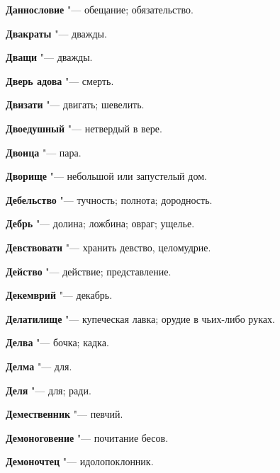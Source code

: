 \begin{mymulticols}{2}
\noindent\textbf{Даннословие} "--- обещание; обязательство. 




\noindent\textbf{Двакраты} "--- дважды. 




\noindent\textbf{Дващи} "--- дважды. 




\noindent\textbf{Дверь адова} "--- смерть. 




\noindent\textbf{Двизати} "--- двигать; шевелить. 




\noindent\textbf{Двоедушный} "--- нетвердый в вере. 




\noindent\textbf{Двоица} "--- пара. 




\noindent\textbf{Дворище} "--- небольшой или запустелый дом. 




\noindent\textbf{Дебельство} "--- тучность; полнота; дородность. 




\noindent\textbf{Дебрь} "--- долина; ложбина; овраг; ущелье. 




\noindent\textbf{Девствовати} "--- хранить девство, целомудрие. 




\noindent\textbf{Действо} "--- действие; представление. 




\noindent\textbf{Декемврий} "--- декабрь. 




\noindent\textbf{Делатилище} "--- купеческая лавка; орудие в чьих-либо руках. 




\noindent\textbf{Делва} "--- бочка; кадка. 




\noindent\textbf{Делма} "--- для. 




\noindent\textbf{Деля} "--- для; ради. 




\noindent\textbf{Демественник} "--- певчий. 




\noindent\textbf{Демоноговение} "--- почитание бесов. 




\noindent\textbf{Демоночтец} "--- идолопоклонник. 





\end{mymulticols}
